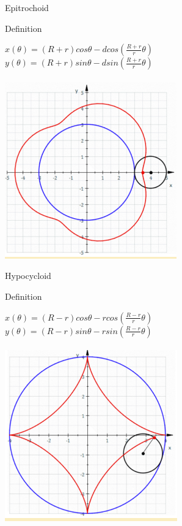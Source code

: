 \documentclass{beamer}
\begin{document}
\begin{frame}{Epitrochoid}
    \begin{block}{Definition}
    \begin{center}
        $x(\theta)=(R+r)cos\theta-d cos(\frac{R+r}{r}\theta)$\\
        $y(\theta)=(R+r)sin\theta-d sin(\frac{R+r}{r}\theta)$\\~\\
        \includegraphics[width=0.55\linewidth]{Epitrochoid.png}
    \end{center}
    \end{block}
\end{frame}
\begin{frame}{Hypocycloid}
    \begin{block}{Definition}
    \begin{center}
        $x(\theta)=(R-r)cos\theta-r cos(\frac{R-r}{r}\theta)$\\
        $y(\theta)=(R-r)sin\theta-r sin(\frac{R-r}{r}\theta)$\\~\\
        \includegraphics[width=0.55\linewidth]{Hypocycloid.png}
    \end{center}
    \end{block}
\end{frame}
\end{document}
